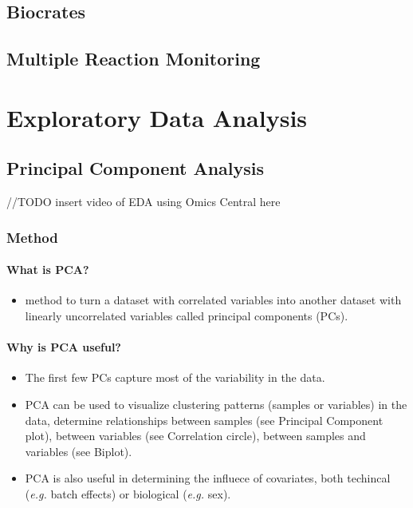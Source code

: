 \documentclass[]{book}
\providecommand{\tightlist}{%
  \setlength{\itemsep}{0pt}\setlength{\parskip}{0pt}}
\begin{document}
\section{Biocrates}\label{biocrates}

\section{Multiple Reaction
Monitoring}\label{multiple-reaction-monitoring}

\chapter{Exploratory Data Analysis}\label{eda}

\section{Principal Component
Analysis}\label{principal-component-analysis}

//TODO insert video of EDA using Omics Central here

\subsection{Method}\label{method}

\subsubsection{What is PCA?}\label{what-is-pca}

\begin{itemize}
\tightlist
\item
  method to turn a dataset with correlated variables into another
  dataset with linearly uncorrelated variables called principal
  components (PCs).
\end{itemize}

\subsubsection{Why is PCA useful?}\label{why-is-pca-useful}

\begin{itemize}
\tightlist
\item
  The first few PCs capture most of the variability in the data.
\item
  PCA can be used to visualize clustering patterns (samples or
  variables) in the data, determine relationships between samples (see
  Principal Component plot), between variables (see Correlation circle),
  between samples and variables (see Biplot).
\item
  PCA is also useful in determining the influece of covariates, both
  techincal (\emph{e.g.} batch effects) or biological (\emph{e.g.} sex).
\end{itemize}
\end{document}
